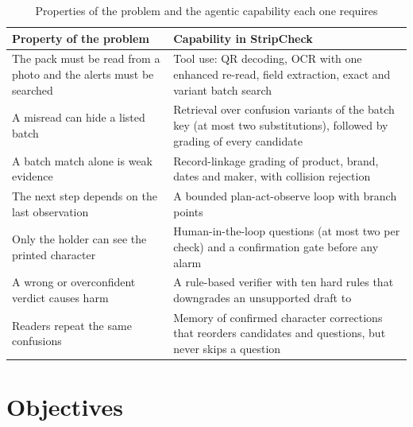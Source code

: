 \begin{table}[htbp]
\centering
\caption{Properties of the problem and the agentic capability each one requires}
\label{tab:intro-capabilities}
\small
\begin{tabularx}{\textwidth}{@{}X X@{}}
\toprule
Property of the problem & Capability in StripCheck \\
\midrule
The pack must be read from a photo and the alerts must be searched & Tool use: QR decoding, OCR
with one enhanced re-read, field extraction, exact and variant batch search \\
A misread can hide a listed batch & Retrieval over confusion variants of the batch key (at most two
substitutions), followed by grading of every candidate \\
A batch match alone is weak evidence & Record-linkage grading of product, brand, dates and maker,
with collision rejection \\
The next step depends on the last observation & A bounded plan-act-observe loop with branch points
\\
Only the holder can see the printed character & Human-in-the-loop questions (at most two per check)
and a confirmation gate before any alarm \\
A wrong or overconfident verdict causes harm & A rule-based verifier with ten hard rules that
downgrades an unsupported draft to \CANTV{} \\
Readers repeat the same confusions & Memory of confirmed character corrections that reorders
candidates and questions, but never skips a question \\
\bottomrule
\end{tabularx}
\end{table}

\section{Objectives}
\label{sec:intro-objectives}

